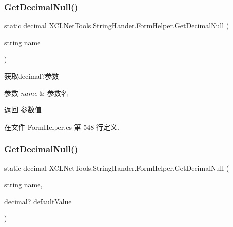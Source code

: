 \subsubsection{\texorpdfstring{Get\+Decimal\+Null()}{GetDecimalNull()}\hspace{0.1cm}{\footnotesize\ttfamily [1/2]}}
{\footnotesize\ttfamily static decimal X\+C\+L\+Net\+Tools.\+String\+Hander.\+Form\+Helper.\+Get\+Decimal\+Null (\begin{DoxyParamCaption}\item[{string}]{name }\end{DoxyParamCaption})\hspace{0.3cm}{\ttfamily [static]}}



获取decimal?参数 


\begin{DoxyParams}{参数}
{\em name} & 参数名\\
\hline
\end{DoxyParams}
\begin{DoxyReturn}{返回}
参数值
\end{DoxyReturn}


在文件 Form\+Helper.\+cs 第 548 行定义.

\mbox{\label{class_x_c_l_net_tools_1_1_string_hander_1_1_form_helper_a5d658cf4e05e92ebcc10d859e72c7d80}} 
\subsubsection{\texorpdfstring{Get\+Decimal\+Null()}{GetDecimalNull()}\hspace{0.1cm}{\footnotesize\ttfamily [2/2]}}
{\footnotesize\ttfamily static decimal X\+C\+L\+Net\+Tools.\+String\+Hander.\+Form\+Helper.\+Get\+Decimal\+Null (\begin{DoxyParamCaption}\item[{string}]{name,  }\item[{decimal?}]{default\+Value }\end{DoxyParamCaption})\hspace{0.3cm}{\ttfamily [static]}}



